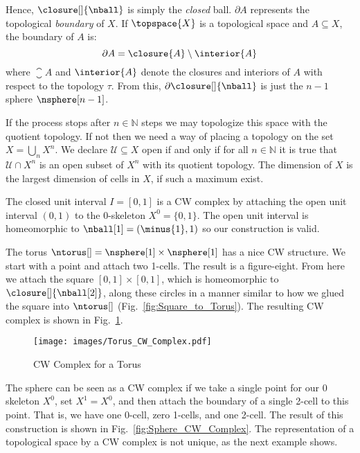     Hence, $\closure[]{\nball}$ is simply the \textit{closed} ball.
    $\partial{A}$ represents the topological \textit{boundary} of
    $X$. If $\topspace{X}$ is a topological space and
    $A\subseteq{X}$, the boundary of $A$ is:
    \begin{equation}
        \partial{A}=\closure{A}\setminus\interior{A}
    \end{equation}
    where $\closure{A}$ and $\interior{A}$ denote the closures and
    interiors of $A$ with respect to the topology $\tau$. From this,
    $\partial\closure[]{\nball}$ is just the $n-1$ sphere
    $\nsphere[n-1]$.
    \par\hfill\par
    If the process stops after $n\in\mathbb{N}$ steps we may
    topologize this space with the quotient topology. If not then we
    need a way of placing a topology on the set $X=\bigcup_{n}X^{n}$. We
    declare $\mathcal{U}\subseteq{X}$ open if and only if for all
    $n\in\mathbb{N}$ it is true that $\mathcal{U}\cap{X}^{n}$ is an open
    subset of $X^{n}$ with its quotient topology. The dimension of $X$
    is the largest dimension of cells in $X$, if such a maximum exist.
    \begin{example}
        The closed unit interval $I=[0,1]$ is a CW complex by attaching
        the open unit interval $(0,1)$ to the 0-skeleton
        $X^{0}=\{0,1\}$. The open unit interval is homeomorphic to
        $\nball[1]=(\minus{1},1)$ so our construction is valid.
    \end{example}
    \begin{example}
        The torus $\ntorus[]=\nsphere[1]\times\nsphere[1]$ has a nice
        CW structure. We start with a point and attach two 1-cells. The
        result is a figure-eight. From here we attach the square
        $[0,1]\times[0,1]$, which is homeomorphic to
        $\closure[]{\nball[2]}$, along these circles in a manner similar
        to how we glued the square into $\ntorus[]$
        (Fig.~\ref{fig:Square_to_Torus}). The resulting CW complex is
        shown in Fig.~\ref{fig:CW_Complex_Torus}.
    \end{example}
    \begin{figure}[H]
        \centering
        \captionsetup{type=figure}
        \texttt{[image: images/Torus\_CW\_Complex.pdf]}
        \caption{CW Complex for a Torus}
        \label{fig:CW_Complex_Torus}
    \end{figure}
    \begin{minipage}[t]{0.52\textwidth}
        \begin{example}
            The sphere can be seen as a CW complex if we take a single
            point for our 0 skeleton $X^{0}$, set $X^{1}=X^{0}$, and
            then attach the boundary of a single 2-cell to this point.
            That is, we have one 0-cell, zero 1-cells, and one 2-cell.
            The result of this construction is shown in
            Fig.~\ref{fig:Sphere_CW_Complex}. The representation of a
            topological space by a CW complex is not unique, as the
            next example shows.
        \end{example}
    \end{minipage}
